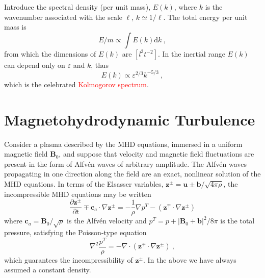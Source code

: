 \documentclass[12pt,a4paper]{article}
\renewcommand{\vec}[1]{\boldsymbol{#1}}
\newcommand{\dif}{\mathrm{d}}
\begin{document}
Introduce the spectral density (per unit mass), $E(k)$, where $k$ is the wavenumber associated with the scale $\ell$, $k \simeq 1/\ell$. The total energy per unit mass is
\begin{equation*}
E/m \propto \int E(k) \dif k ~,
\end{equation*}
from which the dimensions of $E(k)$ are $[l^3 t^{-2}]$. In the inertial range $E(k)$ can depend only on $\varepsilon$ and $k$, thus 
\begin{equation}
E(k) \propto \varepsilon^{2/3} k^{-5/3} ~,
\end{equation}
which is the celebrated \textcolor{red}{Kolmogorov spectrum}.
 
\section{Magnetohydrodynamic Turbulence}
Consider a plasma described by the MHD equations, immersed in a uniform magnetic field $\vec{B}_0$, and suppose that velocity and magnetic field fluctuations are present in the form of Alfv\'en waves of arbitrary amplitude. The Alfv\'en waves propagating in one direction along the field are an exact, nonlinear solution of the MHD equations. In terms of the Elsasser variables, $\vec{z}^\pm = \vec{u} \pm \vec{b}/\sqrt{4\pi \rho}$, the incompressible MHD equations may be written
\begin{equation}
\dfrac{\partial \vec{z}^\pm}{\partial t} \mp \vec{c}_a \cdot \nabla \vec{z}^\pm = -\dfrac{1}{\rho} \nabla p^T -( \vec{z}^\mp \cdot \nabla  \vec{z}^\pm) 
\end{equation}
where $\vec{c}_a = \vec{B}_0/\sqrt{\rho}$ is the Alfv\'en velocity and $p^T = p + |\vec{B}_0 + \vec{b}|^2/8\pi$ is the total pressure,  satisfying the Poisson-type equation
\begin{equation}
\nabla^2 \dfrac{p^T}{\rho} = -\nabla \cdot (\vec{z}^\mp \cdot \nabla  \vec{z}^\pm) ~,
\end{equation}
which guarantees the incompressibility of $\vec{z}^\pm$. In the above we have always assumed a constant density.
\end{document}
